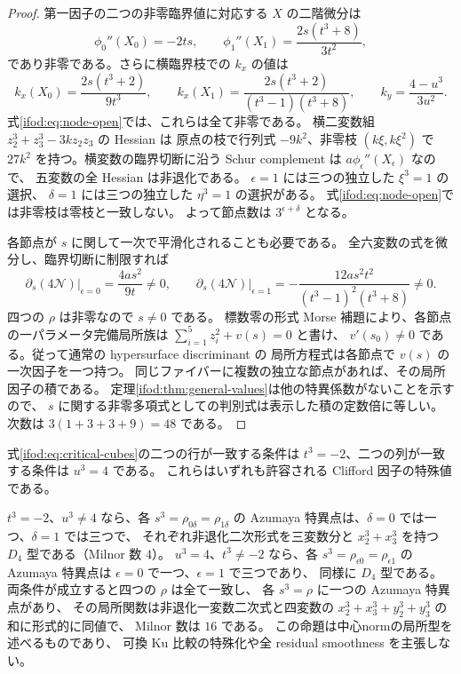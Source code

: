 \begin{proof}
第一因子の二つの非零臨界値に対応する $X$ の二階微分は
\[
 \phi_0''(X_0)=-2ts,\qquad
 \phi_1''(X_1)=\frac{2s(t^3+8)}{3t^2},
\]
であり非零である。さらに横臨界枝での $k_x$ の値は
\begin{equation}\label{ifod:eq:transverse-k}
 k_x(X_0)=\frac{2s(t^3+2)}{9t^3},\qquad
 k_x(X_1)=\frac{2s(t^3+2)}{(t^3-1)(t^3+8)},\qquad
 k_y=\frac{4-u^3}{3u^2}.
\end{equation}
式\eqref{ifod:eq:node-open}では、これらは全て非零である。
横二変数組 $z_2^3+z_3^3-3kz_2z_3$ の Hessian は
原点の枝で行列式 $-9k^2$、非零枝 $(k\xi,k\xi^2)$ で
$27k^2$ を持つ。横変数の臨界切断に沿う Schur complement は
$a\phi_\epsilon''(X_\epsilon)$ なので、
五変数の全 Hessian は非退化である。
$\epsilon=1$ には三つの独立した $\xi^3=1$ の選択、
$\delta=1$ には三つの独立した $\eta^3=1$ の選択がある。
式\eqref{ifod:eq:node-open}では非零枝は零枝と一致しない。
よって節点数は $3^{\epsilon+\delta}$ となる。

各節点が $s$ に関して一次で平滑化されることも必要である。
全六変数の式を微分し、臨界切断に制限すれば
\begin{equation}\label{ifod:eq:parameter-transversality}
 \left.\partial_s(4\mathcal N)\right|_{\epsilon=0}
      =\frac{4as^2}{9t}\ne0,\qquad
 \left.\partial_s(4\mathcal N)\right|_{\epsilon=1}
      =-\frac{12as^2t^2}{(t^3-1)^2(t^3+8)}\ne0.
\end{equation}
四つの $\rho$ は非零なので $s\ne0$ である。
標数零の形式 Morse 補題により、各節点の一パラメータ完備局所族は
$\sum_{i=1}^5z_i^2+v(s)=0$ と書け、
$v'(s_0)\ne0$ である。従って通常の hypersurface discriminant の
局所方程式は各節点で $v(s)$ の一次因子を一つ持つ。
同じファイバーに複数の独立な節点があれば、その局所因子の積である。
定理\ref{ifod:thm:general-values}は他の特異係数がないことを示すので、
$s$ に関する非零多項式としての判別式は表示した積の定数倍に等しい。
次数は $3(1+3+3+9)=48$ である。
\end{proof}

\begin{proposition}
\label{ifod:prop:collision-types}
式\eqref{ifod:eq:critical-cubes}の二つの行が一致する条件は
$t^3=-2$、二つの列が一致する条件は $u^3=4$ である。
これらはいずれも許容される Clifford 因子の特殊値である。

$t^3=-2$、$u^3\ne4$ なら、各 $s^3=\rho_{0\delta}=\rho_{1\delta}$ の
Azumaya 特異点は、$\delta=0$ では一つ、$\delta=1$ では三つで、
それぞれ非退化二次形式を三変数分と
$x_2^3+x_3^3$ を持つ $D_4$ 型である（Milnor 数 $4$）。
$u^3=4$、$t^3\ne-2$ なら、各 $s^3=\rho_{\epsilon0}=\rho_{\epsilon1}$ の
Azumaya 特異点は $\epsilon=0$ で一つ、$\epsilon=1$ で三つであり、
同様に $D_4$ 型である。
両条件が成立すると四つの $\rho$ は全て一致し、
各 $s^3=\rho$ に一つの Azumaya 特異点があり、
その局所関数は非退化一変数二次式と四変数の
$x_2^3+x_3^3+y_2^3+y_3^3$ の和に形式的に同値で、
Milnor 数は $16$ である。
この命題は中心normの局所型を述べるものであり、
可換 Ku 比較の特殊化や全 residual smoothness を主張しない。
\end{proposition}

